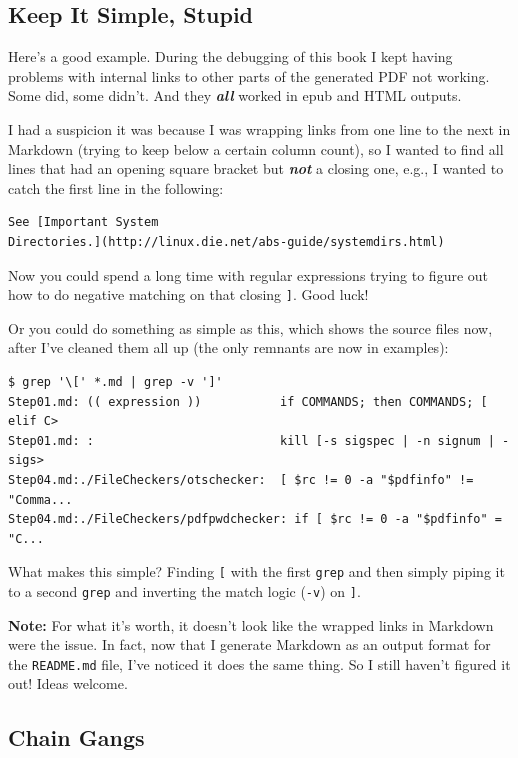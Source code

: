 \documentclass[10pt,]{book}
\numberwithin{figure}{chapter}
\begin{document}
\subsection{Keep It Simple, Stupid}\label{keep-it-simple-stupid}

Here's a good example. During the debugging of this book I kept having
problems with internal links to other parts of the generated PDF not
working. Some did, some didn't. And they \textbf{\emph{all}} worked in
epub and HTML outputs.

I had a suspicion it was because I was wrapping links from one line to
the next in Markdown (trying to keep below a certain column count), so I
wanted to find all lines that had an opening square bracket but
\textbf{\emph{not}} a closing one, e.g., I wanted to catch the first
line in the following:

\begin{verbatim}
See [Important System
Directories.](http://linux.die.net/abs-guide/systemdirs.html)
\end{verbatim}

Now you could spend a long time with regular expressions trying to
figure out how to do negative matching on that closing \texttt{{]}}.
Good luck!

Or you could do something as simple as this, which shows the source
files now, after I've cleaned them all up (the only remnants are now in
examples):

\begin{verbatim}
$ grep '\[' *.md | grep -v ']'
Step01.md: (( expression ))           if COMMANDS; then COMMANDS; [ elif C>
Step01.md: :                          kill [-s sigspec | -n signum | -sigs>
Step04.md:./FileCheckers/otschecker:  [ $rc != 0 -a "$pdfinfo" != "Comma...
Step04.md:./FileCheckers/pdfpwdchecker: if [ $rc != 0 -a "$pdfinfo" = "C...
\end{verbatim}

What makes this simple? Finding \texttt{{[}} with the first
\texttt{grep} and then simply piping it to a second \texttt{grep} and
inverting the match logic (\texttt{-v}) on \texttt{{]}}.

\textbf{Note:} For what it's worth, it doesn't look like the wrapped
links in Markdown were the issue. In fact, now that I generate Markdown
as an output format for the \texttt{README.md} file, I've noticed it
does the same thing. So I still haven't figured it out! Ideas welcome.

\subsection{Chain Gangs}\label{chain-gangs}
\end{document}
